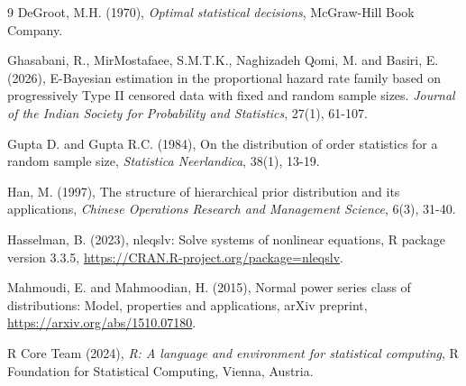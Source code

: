 \documentclass[twoside]{article}
\begin{document}
\begin{thebibliography}{9}
DeGroot, M.H. (1970), {\it Optimal statistical decisions}, McGraw-Hill Book Company.

Ghasabani, R., MirMostafaee, S.M.T.K., Naghizadeh Qomi, M. and  Basiri, E. (2026), E-Bayesian estimation in the proportional hazard rate family based on progressively Type II censored data with fixed and random sample sizes. {\it Journal of the Indian Society for Probability and Statistics}, 27(1), 61-107.

Gupta D. and Gupta R.C. (1984), On the distribution of order statistics for a random sample size, {\it Statistica  Neerlandica}, {38}(1), 13-19.

Han, M. (1997), The structure of hierarchical prior distribution and its applications, {\it Chinese Operations Research and Management Science},  {6}(3), 31-40.

 Hasselman, B.  (2023), nleqslv: Solve systems of nonlinear equations, R package   version 3.3.5, 
\url{https://CRAN.R-project.org/package=nleqslv}.



Mahmoudi, E. and Mahmoodian, H. (2015), Normal power series class of distributions: Model, properties and applications, arXiv preprint, \url{https://arxiv.org/abs/1510.07180}.

R Core Team (2024), {\it R: A language and environment for statistical computing}, R Foundation for Statistical Computing, Vienna, Austria.


\end{thebibliography}
\end{document}
